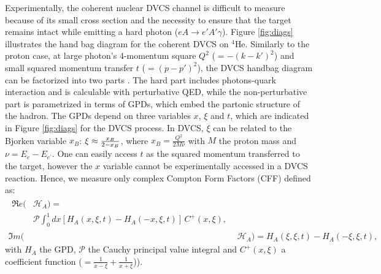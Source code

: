\documentclass[nofootinbib,twocolumn,showpacs,prl,superscriptaddress,secnumarabic,amssymb,nobibnotes,aps,floatfix,preprint]{revtex4}
\begin{document}
Experimentally, the coherent nuclear DVCS channel is difficult to measure because of 
its small cross section and the necessity to ensure that the target remains 
intact while emitting a hard photon ($eA \rightarrow e' A' \gamma$). Figure 
\ref{fig:diags} illustrates the hand bag diagram for the coherent DVCS on 
$^4$He. Similarly to the proton case, at large photon's 4-momentum square 
$Q^2$ ($= -(k-k')^{2}$) and small squared momentum transfer $t$ 
($= (p-p')^{2}$), the DVCS handbag diagram can be factorized into two parts 
\cite{Freund_Collins,Ji_Osborne}. The hard part includes photons-quark 
interaction and is calculable with perturbative QED, while the non-perturbative 
part is parametrized in terms of GPDs, which embed the partonic structure of 
the hadron. The GPDs depend on three variables $x$, $\xi$ and $t$, which are 
indicated in Figure \ref{fig:diags} for the DVCS process. In DVCS, $\xi$ can 
be related to the Bjorken variable $x_{B}$: $\xi\approx {{x_B}\over{2-x_B}}$, 
where $x_B=\frac{Q^2}{2M\nu}$ with $M$ the proton mass and 
$\nu=E_e-E_{e^\prime}$. One can easily access $t$ as the squared momentum 
transferred to the target, however the $x$ variable cannot be experimentally 
accessed in a DVCS reaction. Hence, we measure only complex Compton Form 
Factors (CFF) \cite{Guidal:2013rya} defined as:
\begin{align}
\begin{split}
\Re e(&\mathcal{H}_{A}) = \\
    &\mathcal{P} 
\int_{0}^{1}dx[H_A(x,\xi,t)-H_A(-x,\xi,t)] \, C^{+}(x,\xi), 
\end{split} \\
\Im m(&\mathcal{H}_{A}) = H_A(\xi,\xi,t)-H_A(-\xi,\xi,t),
\end{align}
with $H_A$ the GPD, $\mathcal{P}$ 
the Cauchy principal value integral and $C^{+}(x,\xi)$ a 
coefficient function ($=  \frac{1}{x-\xi} + \frac{1}{x+\xi}$)).
\end{document}
